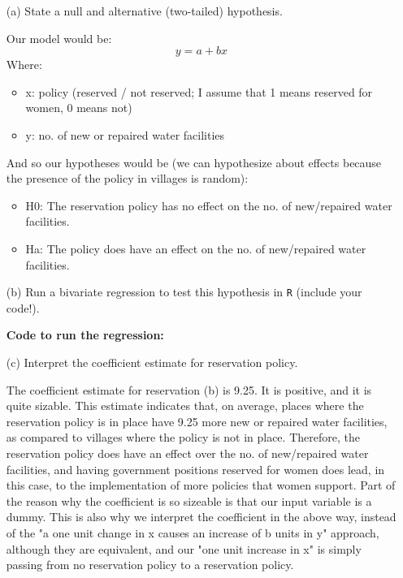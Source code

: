 \documentclass[12pt,letterpaper]{article}
\begin{document}
\newpage
\begin{enumerate}
	\item [(a)] State a null and alternative (two-tailed) hypothesis. 
	\vspace{.5cm}
	
	Our model would be: 
	\begin{equation}
		y = a + bx
	\end{equation}
	Where: 
		\begin{itemize}
		\item x: policy (reserved / not reserved; I assume that 1 means reserved for women, 0 means not)
		\item y:  no. of new or repaired water facilities 
	\end{itemize}
	And so our hypotheses would be (we can hypothesize about effects because the presence of the policy in villages is random): 
	\begin{itemize}
		\item H0: The reservation policy has no effect on the no. of new/repaired water facilities.
		\item Ha: The policy does have an effect on the no. of new/repaired water facilities. 
	\end{itemize}
		
	\item [(b)] Run a bivariate regression to test this hypothesis in \texttt{R} (include your code!).
	\vspace{.5cm}
	
	\noindent \textbf {Code to run the regression:}
	
	
	\item [(c)] Interpret the coefficient estimate for reservation policy. 
	\vspace{.5cm}
	
	The coefficient estimate for reservation (b) is 9.25. It is positive, and it is quite sizable. This estimate indicates that, on average, places where the reservation policy is in place have 9.25 more new or repaired water facilities, as compared to villages where the policy is not in place. Therefore, the reservation policy does have an effect over the no. of new/repaired water facilities, and having government positions reserved for women does lead, in this case, to the implementation of more policies that women support. 
	Part of the reason why the coefficient is so sizeable is that our input variable is a dummy. This is also why we interpret the coefficient in the above way, instead of the "a one unit change in x causes an increase of b units in y" approach, although they are equivalent, and our "one unit increase in x" is simply passing from no reservation policy to a reservation policy. 
	
\end{enumerate}
\end{document}
